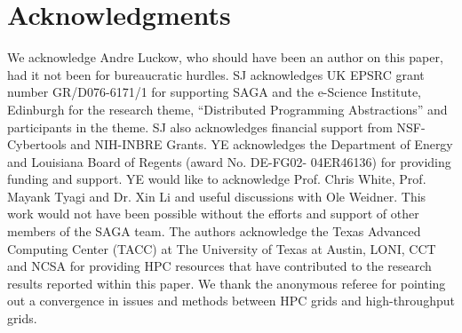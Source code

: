 \documentclass{sig-alternate}
\newcommand{\up}{\vspace*{-0.3em}}
\begin{document}



\up \up
\section{Acknowledgments}
We acknowledge Andre Luckow, who should have been an author on this
paper, had it not been for bureaucratic hurdles.  SJ acknowledges UK
EPSRC grant number GR/D076-6171/1 for supporting SAGA and the e-Science
Institute, Edinburgh for the research theme, ``Distributed Programming
Abstractions'' and participants in the theme. SJ also acknowledges
financial support from NSF-Cybertools and NIH-INBRE Grants. YE
acknowledges the Department of Energy and Louisiana Board of Regents
(award No. DE-FG02- 04ER46136) for providing funding and support. YE
would like to acknowledge Prof. Chris White, Prof. Mayank Tyagi and
Dr. Xin Li and useful discussions with Ole Weidner. This work would
not have been possible without the efforts and support of other
members of the SAGA team. The authors acknowledge the Texas Advanced
Computing Center (TACC) at The University of Texas at Austin, LONI, CCT and
NCSA for providing HPC resources that have contributed to the research
results reported within this paper. We thank the anonymous referee for pointing out a
convergence in issues and methods between HPC grids and high-throughput grids.

 

\end{document}
